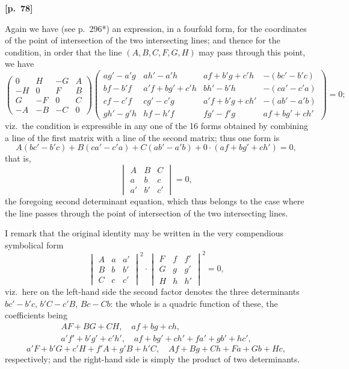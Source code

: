 \documentclass[11pt,a4paper]{book}
\begin{document}
\vspace{0.5em}
\noindent\textbf{[p.\ 78]}

Again we have (see p.\ 296*) an expression, in a fourfold form, for the coordinates of the point of intersection of the two intersecting lines; and thence for the condition, in order that the line $(A, B, C, F, G, H)$ may pass through this point, we have
$$
\begin{pmatrix}
0 & H & -G & A \\
-H & 0 & F & B \\
G & -F & 0 & C \\
-A & -B & -C & 0
\end{pmatrix}
\begin{pmatrix}
ag' - a'g & ah' - a'h & af + b'g + c'h & -(bc' - b'c) \\
bf - b'f & a'f + bg' + c'h & bh' - b'h & -(ca' - c'a) \\
cf - c'f & cg' - c'g & a'f + b'g + ch' & -(ab' - a'b) \\
gh' - g'h & hf - h'f & fg' - f'g & af + bg' + ch'
\end{pmatrix}
= 0;
$$
viz.\ the condition is expressible in any one of the 16 forms obtained by combining a line of the first matrix with a line of the second matrix; thus one form is
$$
A(bc' - b'c) + B(ca' - c'a) + C(ab' - a'b) + 0 \cdot (af + bg' + ch') = 0,
$$
that is,
$$
\begin{vmatrix} A & B & C \\ a & b & c \\ a' & b' & c' \end{vmatrix} = 0,
$$
the foregoing second determinant equation, which thus belongs to the case where the line passes through the point of intersection of the two intersecting lines.

I remark that the original identity may be written in the very compendious symbolical form
$$
\begin{vmatrix} A & a & a' \\ B & b & b' \\ C & c & c' \end{vmatrix}^2
\cdot
\begin{vmatrix} F & f & f' \\ G & g & g' \\ H & h & h' \end{vmatrix}^2
= 0,
$$
viz.\ here on the left-hand side the second factor denotes the three determinants $bc' - b'c$, $b'C - c'B$, $Bc - Cb$: the whole is a quadric function of these, the coefficients being
\begin{gather*}
AF + BG + CH, \quad af + bg + ch, \\
a'f' + b'g' + c'h', \quad af + bg' + ch' + fa' + gb' + hc',
\end{gather*}
$$
a'F + b'G + c'H + f'A + g'B + h'C, \quad Af + Bg + Ch + Fa + Gb + Hc,
$$
respectively; and the right-hand side is simply the product of two determinants.
\end{document}
